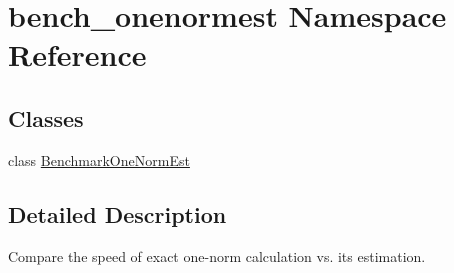 \hypertarget{namespacebench__onenormest}{}\section{bench\+\_\+onenormest Namespace Reference}
\label{namespacebench__onenormest}
\subsection*{Classes}
\begin{DoxyCompactItemize}
\item 
class \hyperlink{classbench__onenormest_1_1BenchmarkOneNormEst}{Benchmark\+One\+Norm\+Est}
\end{DoxyCompactItemize}


\subsection{Detailed Description}
\begin{DoxyVerb}Compare the speed of exact one-norm calculation vs. its estimation.
\end{DoxyVerb}
 